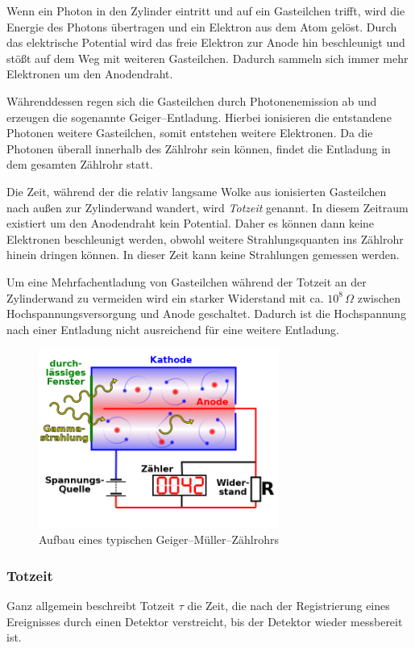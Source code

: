 \documentclass[12pt,a4paper]{scrartcl}
\numberwithin{equation}{section} %
\begin{document}
Wenn ein Photon in den Zylinder eintritt und auf ein Gasteilchen trifft, wird die Energie des Photons übertragen und ein Elektron aus dem Atom gelöst. Durch das elektrische Potential wird das freie Elektron zur Anode hin beschleunigt und stößt auf dem Weg mit weiteren Gasteilchen. Dadurch sammeln sich immer mehr Elektronen um den Anodendraht.

Währenddessen regen sich die Gasteilchen durch Photonenemission ab und erzeugen die sogenannte Geiger--Entladung. Hierbei ionisieren die entstandene Photonen weitere Gasteilchen, somit entstehen weitere Elektronen. Da die Photonen überall innerhalb des Zählrohr sein können, findet die Entladung in dem gesamten Zählrohr statt.

Die Zeit, während der die relativ langsame Wolke aus ionisierten Gasteilchen nach außen zur Zylinderwand wandert, wird \emph{Totzeit} genannt. In diesem Zeitraum existiert um den Anodendraht kein Potential. Daher es können dann keine Elektronen beschleunigt werden, obwohl weitere Strahlungsquanten ins Zählrohr hinein dringen können. In dieser Zeit kann keine Strahlungen gemessen werden.

Um eine Mehrfachentladung von Gasteilchen während der Totzeit an der Zylinderwand zu vermeiden wird ein starker Widerstand mit ca. $10^8\,\Omega$ zwischen Hochspannungsversorgung und Anode geschaltet. Dadurch ist die Hochspannung nach einer Entladung nicht ausreichend für eine weitere Entladung.

\begin{figure}[h!]
	\centering
	\includegraphics[width=0.7\textwidth]{../media/B3.1/640px-Geiger_Mueller_Counter_with_Circuit-de.svg.png}
	\caption{Aufbau eines typischen Geiger--Müller--Zählrohrs \cite{File:Geigerzählrohr}}
	\label{fig:Geiger--Müller--Zählrohr}
\end{figure}

\subsubsection{Totzeit}
\label{Totzeit}
Ganz allgemein beschreibt Totzeit $\tau$ die Zeit, die nach der Registrierung eines Ereignisses durch einen Detektor verstreicht, bis der Detektor wieder messbereit ist. \cite{Totzeit}
\end{document}
